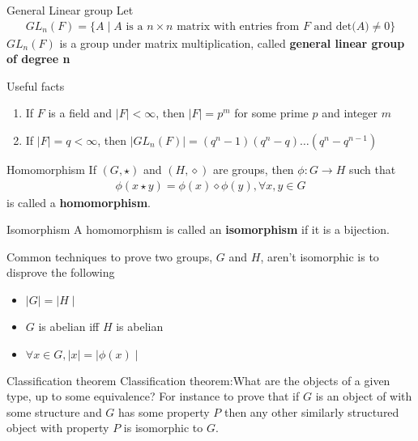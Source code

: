 \documentclass[titlepage, 12pt]{article}
\begin{document}
\begin{definition}{General Linear group}{}
    Let
\begin{gather*}
GL_n(F) = \{A\mid A \textrm{ is a } n\times n\textrm{ matrix with entries from }
F\textrm{ and det(}A)\neq 0\}
\end{gather*}
$GL_n(F)$ is a group under matrix multiplication, called \textbf{general linear
group of degree n}
\end{definition}

Useful facts
\begin{enumerate}

    \item If $F$ is a field and $|F| < \infty$, then $|F| = p^m$ for some prime
        $p$ and integer $m$

    \item If $|F| = q < \infty$, then $|GL_n(F)| = (q^n - 1)(q^n -
        q)\dots(q^n-q^{n - 1})$

\end{enumerate}


\begin{definition}{Homomorphism}{}
If $(G, \star)$ and $(H, \diamond)$ are groups, then $\phi:G\rightarrow H$ such
that
\begin{gather*}
    \phi(x\star y) = \phi(x)\diamond\phi(y), \forall x, y\in G
\end{gather*}
is called a \textbf{homomorphism}.
\end{definition}

\begin{definition}{Isomorphism}{}
A homomorphism is called an \textbf{isomorphism} if it is a bijection.
\end{definition}

Common techniques to prove two groups, $G$ and $H$, aren't isomorphic is to
disprove the following

\begin{itemize}

    \item $\mid G\mid = \mid H\mid$
        
    \item $G$ is abelian iff $H$ is abelian

    \item $\forall x\in G, \mid x\mid = \mid\phi(x)\mid$
\end{itemize}

\begin{definition}{Classification theorem}{}
{Classification theorem}:What are the objects of a given type, up to some
equivalence? For instance to prove that if $G$ is an object of with some
structure and $G$ has some property $P$ then any other similarly structured
object with property $P$ is isomorphic to $G$.
\end{definition}
\end{document}
